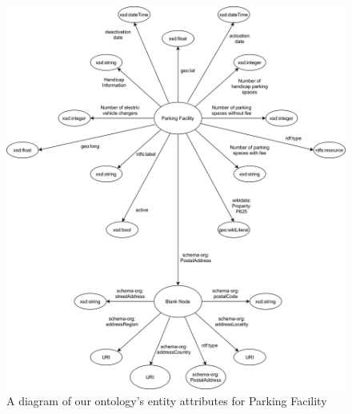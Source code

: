 \begin{figure}[H]
	\centering
	\includegraphics[scale=0.13]{figures/parking-facility-attributes.png}
	\caption{A diagram of our ontology's entity attributes for Parking Facility}
\end{figure}

